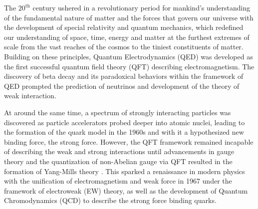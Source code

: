 \documentclass[../thesis.tex]{subfiles}
\begin{document}
\vspace{-1\baselineskip}

The $20^\text{th}$ century ushered in a revolutionary period for mankind's understanding of the fundamental nature of matter and the forces that govern our universe with the development of special relativity and quantum mechanics, which redefined our understanding of space, time, energy and matter at the furthest extremes of scale from the vast reaches of the cosmos to the tiniest constituents of matter. Building on these principles, Quantum Electrodynamics (QED) \citep{PhysRev.73.416,PhysRev.76.769,Tomonaga:1946zz} was developed as the first successful quantum field theory (\acs{QFT}) describing electromagnetism. The discovery of beta decay \citep{Fermi1967} and its paradoxical behaviors within the framework of \acs{QED} prompted the prediction of neutrinos and development of the theory of weak interaction.

At around the same time, a spectrum of strongly interacting particles was discovered \citep{intro:griffiths} as particle accelerators probed deeper into atomic nuclei, leading to the formation of the quark model in the 1960s and with it a hypothesized new binding force, the strong force. However, the \acs{QFT} framework remained incapable of describing the weak and strong interactions until advancements in gauge theory and the quantization of non-Abelian gauge via \acs{QFT} resulted in the formation of Yang-Mills theory \citep{theory:yangmills,theory:yangmills2}. This sparked a renaissance in modern physics with the unification of electromagnetism and weak force in 1967 under the framework of electroweak (\acs{EW}) \citep{Glashow1961} theory, as well as the development of Quantum Chromodynamics (\acs{QCD}) \citep{PhysRevLett.30.1343,PhysRevLett.30.1346} to describe the strong force binding quarks.
\end{document}
